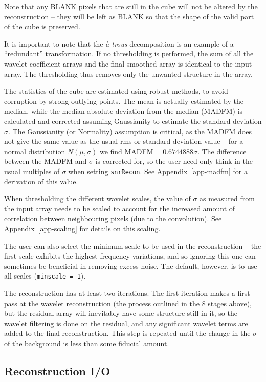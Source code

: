 \documentclass[12pt,a4paper]{article}
\begin{document}
Note that any BLANK pixels that are still in the cube will not be
altered by the reconstruction -- they will be left as BLANK so that
the shape of the valid part of the cube is preserved.

It is important to note that the {\it {\`a} trous} decomposition is
an example of a ``redundant'' transformation. If no thresholding is
performed, the sum of all the wavelet coefficient arrays and the final
smoothed array is identical to the input array. The thresholding thus
removes only the unwanted structure in the array. 

The statistics of the cube are estimated using robust methods, to
avoid corruption by strong outlying points. The mean is actually
estimated by the median, while the median absolute deviation from the
median (MADFM) is calculated and corrected assuming Gaussianity to
estimate the standard deviation $\sigma$. The Gaussianity (or
Normality) assumption is critical, as the MADFM does not give the same
value as the usual rms or standard deviation value -- for a normal
distribution $N(\mu,\sigma)$ we find MADFM$=0.6744888\sigma$. The
difference between the MADFM and $\sigma$ is corrected for, so the
user need only think in the usual multiples of $\sigma$ when setting
{\tt snrRecon}. See Appendix~\ref{app-madfm} for a derivation of this
value.

When thresholding the different wavelet scales, the value of $\sigma$
as measured from the input array needs to be scaled to account for the
increased amount of correlation between neighbouring pixels (due to
the convolution). See Appendix~\ref{app-scaling} for details on this
scaling. 

The user can also select the minimum scale to be used in the
reconstruction -- the first scale exhibits the highest frequency
variations, and so ignoring this one can sometimes be beneficial in
removing excess noise. The default, however, is to use all scales
({\tt minscale = 1}).

The reconstruction has at least two iterations. The first iteration
makes a first pass at the wavelet reconstruction (the process outlined
in the 8 stages above), but the residual array will inevitably have
some structure still in it, so the wavelet filtering is done on the
residual, and any significant wavelet terms are added to the final
reconstruction. This step is repeated until the change in the $\sigma$
of the background is less than some fiducial amount.

\subsection{Reconstruction I/O}
\end{document}
